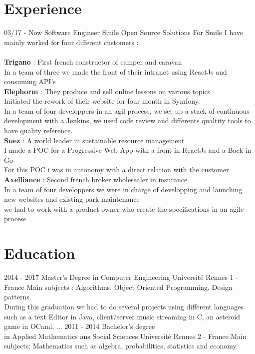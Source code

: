\documentclass{friggeri-cv}
\begin{document}
\section{Experience}
\begin{entrylist}
	\entry
	{03/17 - Now}
	{Software Engineer}
	{Smile Open Source Solutions}
	{
		For Smile I have mainly worked for four different customers : \\
		\\
		\textbf{Trigano} : First french constructor of camper and caravan \\
			In a team of three we made the front of their intranet using ReactJs and consuming API's \\
		\textbf{Elephorm} : They produce and sell online lessons on various topics \\ 
			Initiated the rework of their website for four month in Symfony. \\
			In a team of four developpers in an agil process, we set up a stack of continuous development with a Jenkins, we used code review and differents qualtity tools to have quality reference. \\
		\textbf{Suez} : A world leader in sustainable resource management \\
				I made a POC for a Progressive Web App with a front in ReactJs and a Back in Go \\
				For this POC i was in autonomy with a direct relation with the customer \\
		\textbf{Axelliance} : Second french broker wholesealer in insurance \\
			In a team of four developpers we were in charge of developping and launching new websites and existing park maintenance \\
			we had to work with a product owner who create the specifications in an agile process 
	}
\end{entrylist}

\section{Education}
\begin{entrylist}
	\entry
	{2014 - 2017}
	{Master's Degree in Computer Engineering}
	{Université Rennes 1 - France}
	{Main subjects : Algorithms, Object Oriented Programming, Design patterns. \\
	During this graduation we had to do several projects using different languages
	such as a text Editor in Java, client/server music streaming in C, an asteroid game in OCaml, ...
	}
	\entry
	{2011 - 2014}
	{Bachelor's degree \\in Applied Mathematics ans Social Sciences }
	{Université Rennes 2 - France}
	{Main subjects: Mathematics such as algebra, probabilities, statistics and economy.}
\end{entrylist}
\end{document}
